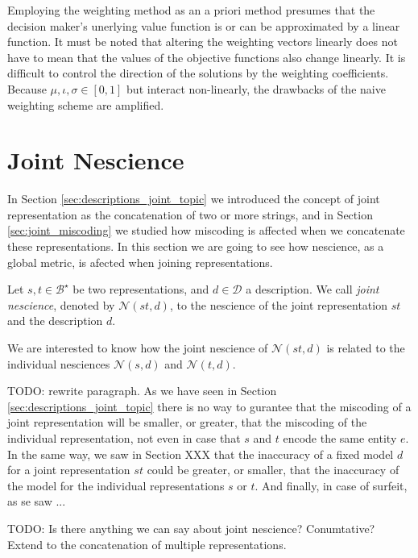 Employing the weighting method as an a priori method presumes that the decision maker's unerlying value function is or can be approximated by a linear function. It must be noted that altering the weighting vectors linearly does not have to mean that the values of the objective functions also change linearly. It is difficult to control the direction of the solutions by the weighting coefficients. Because $\mu,\iota,\sigma \in [0,1]$ but interact non-linearly, the drawbacks of the naive weighting scheme are amplified.

%
%

\section{Joint Nescience}

In Section \ref{sec:descriptions_joint_topic} we introduced the concept of joint representation as the concatenation of two or more strings, and in Section \ref{sec:joint_miscoding} we studied how miscoding is affected when we concatenate these representations. In this section we are going to see how nescience, as a global metric, is afected when joining representations.

\begin{definition}
Let $s, t \in \mathcal{B}^\star$ be two representations, and $d \in \mathcal{D}$ a description. We call \emph{joint nescience}, denoted by $\mathcal{N} (st, d)$, to the nescience of the joint representation $st$ and the description $d$.
\end{definition}

We are interested to know how the joint nescience of $\mathcal{N} (st, d)$ is related to the individual nesciences $\mathcal{N} (s, d)$ and $\mathcal{N} (t, d)$.

{\color{red} TODO: rewrite paragraph.} As we have seen in Section \ref{sec:descriptions_joint_topic} there is no way to gurantee that the miscoding of a joint representation will be smaller, or greater, that the miscoding of the individual representation, not even in case that $s$ and $t$ encode the same entity $e$. In the same way, we saw in Section {\color{red} XXX} that the inaccuracy of a fixed model $d$ for a joint representation $st$ could be greater, or smaller, that the inaccuracy of the model for the individual representations $s$ or $t$. And finally, in case of surfeit, as se saw ...

{\color{red} TODO: Is there anything we can say about joint nescience? Conumtative? Extend to the concatenation of multiple representations.}

